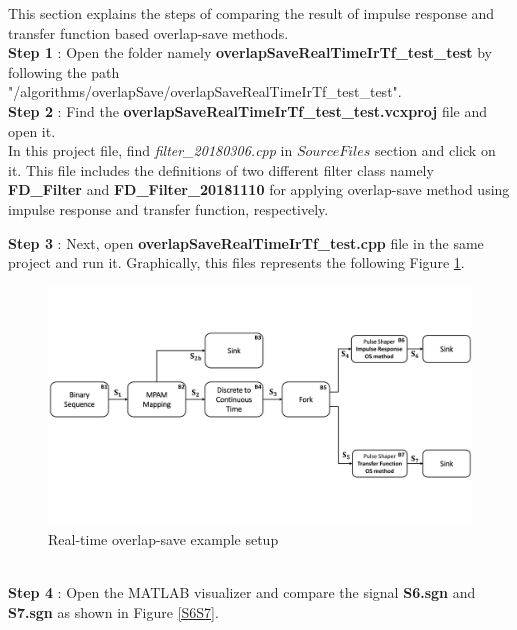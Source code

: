 \begin{refsection}
This section explains the steps of comparing the result of impulse response and transfer function based overlap-save methods.\\
\textbf{Step 1} : Open the folder namely \textbf{overlapSaveRealTimeIrTf\_test\_test} by following the path "/algorithms/overlapSave/overlapSaveRealTimeIrTf\_test\_test".\\
\textbf{Step 2} : Find the \textbf{overlapSaveRealTimeIrTf\_test\_test.vcxproj} file and open it.\\
In this project file, find \textit{filter\_20180306.cpp} in $Source Files$ section and click on it. This file includes the  definitions of two different filter class namely \textbf{FD\_Filter} and \textbf{FD\_Filter\_20181110} for applying overlap-save method using impulse response and transfer function, respectively.

\textbf{Step 3} : Next, open \textbf{overlapSaveRealTimeIrTf\_test.cpp} file in the same project and run it. Graphically, this files represents the following Figure \ref*{realTimeOverlapSave}.\\
\begin{figure}[h]
	\centering
	\includegraphics[width=12cm]{./algorithms/overlap_save/figures/realTimeOverlapSave.pdf}
	\caption{Real-time overlap-save example setup}\label{realTimeOverlapSave}
\end{figure}\\
\textbf{Step 4} : Open the MATLAB visualizer and compare the signal \textbf{S6.sgn} and \textbf{S7.sgn} as shown in Figure \ref{S6S7}.
\begin{figure}[h]
	\centering

\end{figure}
\end{refsection}
